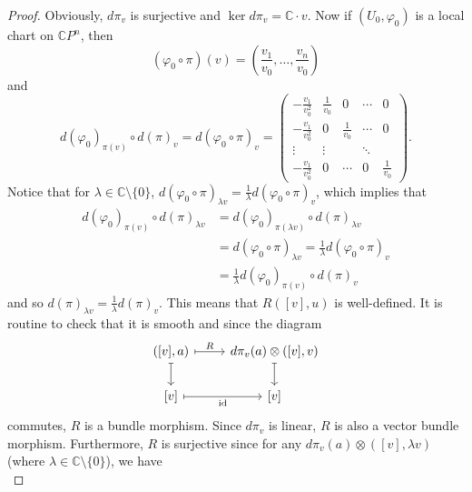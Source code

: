 \documentclass[10pt, a4paper]{article}
\newenvironment{noticeC}{%
  \tcolorbox[%
  notitle,
  empty,
  enhanced,  %
  breakable,
  coltext=black, 
  fontupper=\rmfamily,
  noparskip,
  sharp corners,
  boxrule=-1pt,  %
  frame hidden,
  left=7pt,  %
  right=7pt,
  top=5pt,
  bottom=5pt,
  before skip=2.5ex plus 2pt,
  after skip=2.5ex plus 2pt,
  overlay unbroken and last={%
  },
  ]}
{\endtcolorbox}
\newenvironment{myproof}%
  {\begin{noticeC}\begin{proof}}%
  {\end{proof}\end{noticeC}}
\newcommand{\C}{\mathbb {C}}
\DeclareMathOperator{\id}{id}
\begin{document}
\begin{myproof}
  Obviously, $d \pi_v$ is surjective and $\ker d\pi_v = \C \cdot v$.
  Now if $(U_0, \varphi_0)$ is a local chart on $\C P^n$, then 
  $$(\varphi_0 \circ \pi) (v) = \left(\frac{v_1}{v_0}, \dots, \frac{v_n}{v_0}\right)$$
  and $$d(\varphi_0)_{\pi(v)} \circ d(\pi)_v = d(\varphi_0 \circ \pi)_v = \begin{pmatrix}
    -\frac{v_1}{v_0^2} & \frac{1}{v_0} & 0 & \cdots & 0\\
    -\frac{v_1}{v_0^2} & 0 &\frac{1}{v_0} & \cdots & 0\\
    \vdots & \vdots & & \ddots & \\
    -\frac{v_1}{v_0^2} & 0 & \cdots & 0 & \frac{1}{v_0}
  \end{pmatrix}.$$
  Notice that for $\lambda \in \C \setminus \{0\}$, $d(\varphi_0 \circ \pi)_{\lambda v} = \frac{1}{\lambda} d(\varphi_0 \circ \pi)_{v}$, which implies that 
  \begin{align*}
    d(\varphi_0)_{\pi(v)} \circ d(\pi)_{\lambda v} &= d(\varphi_0)_{\pi( \lambda v)} \circ d(\pi)_{\lambda v}\\ 
    &= d(\varphi_0 \circ \pi)_{\lambda v} = \frac{1}{\lambda} d(\varphi_0 \circ \pi)_v \\
    &= \frac{1}{\lambda} d(\varphi_0)_{\pi(v)} \circ d(\pi)_v
  \end{align*}
  and so $d(\pi)_{\lambda v} = \frac{1}{\lambda} d(\pi)_{v}$. This means that $R([v], u)$ is well-defined.
  It is routine to check that it is smooth and since the diagram 
\[\begin{tikzcd}
	{([v], a)} & {d \pi_v (a) \otimes ([v], v)} \\
	{[v]} & {[v]}
	\arrow["R", maps to, from=1-1, to=1-2]
	\arrow[maps to, from=1-1, to=2-1]
	\arrow[maps to, from=1-2, to=2-2]
	\arrow["\id"', maps to, from=2-1, to=2-2]
\end{tikzcd}\]
  commutes, $R$ is a bundle morphism. Since $d\pi_v$ is linear, $R$ is also a vector bundle morphism.
  Furthermore, $R$ is surjective since for any $d \pi_v (a) \otimes ([v], \lambda v)$ (where $\lambda \in \C \setminus \{0\}$), we have
  \begin{equation*}

\end{equation*}
\end{myproof}
\end{document}
